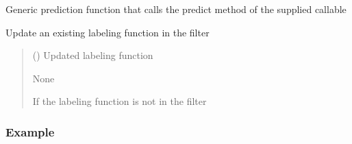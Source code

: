 \documentclass[letterpaper,10pt,english]{sphinxmanual}
\begin{document}
\begin{fulllineitems}

\begin{fulllineitems}
\label{\detokenize{filters:at_nlp.filters.string_filter.StringFilter.transform}}
\pysigstartsignatures
{}
\pysigstopsignatures
\sphinxAtStartPar
Generic prediction function that calls the predict method of the supplied callable

\end{fulllineitems}


\begin{fulllineitems}
\label{\detokenize{filters:at_nlp.filters.string_filter.StringFilter.update_labeling_fn}}
\pysigstartsignatures
{}
\pysigstopsignatures
\sphinxAtStartPar
Update an existing labeling function in the filter
\begin{quote}\begin{description}
\sphinxAtStartPar
{} () \textendash{} Updated labeling function

\sphinxAtStartPar
None

\sphinxAtStartPar
{} \textendash{} If the labeling function is not in the filter

\end{description}\end{quote}
\subsubsection*{Example}


\end{fulllineitems}
\end{fulllineitems}
\end{document}
